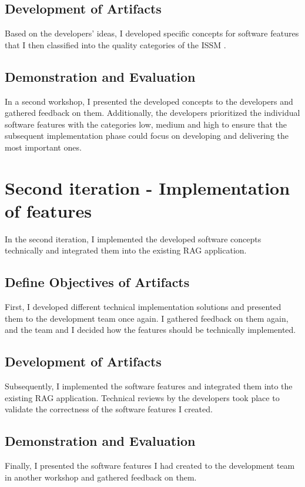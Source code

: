 \documentclass[
	english,
	ruledheaders=section,%
	class=report,%
	thesis={type=bachelor},%
	accentcolor=1b,%
	custommargins=true,%
	marginpar=false,%
	parskip=half-,%
	fontsize=11pt,%
	DIV=14,
]{tudapub}
\begin{document}
\subsection{Development of Artifacts}
Based on the developers' ideas, I developed specific concepts for software features that I then classified into the quality categories of the ISSM \parencite{DeloneMcLean2003ISSuccessTenYearUpdate}.
\subsection{Demonstration and Evaluation}
In a second workshop, I presented the developed concepts to the developers and gathered feedback on them. Additionally, the developers prioritized the individual software features with the categories low, medium and high to ensure that the subsequent implementation phase could focus on developing and delivering the most important ones.
\section{Second iteration - Implementation of features}
In the second iteration, I implemented the developed software concepts technically and integrated them into the existing RAG application.
\subsection{Define Objectives of Artifacts}
First, I developed different technical implementation solutions and presented them to the development team once again. I gathered feedback on them again, and the team and I decided how the features should be technically implemented.
\subsection{Development of Artifacts}
Subsequently, I implemented the software features and integrated them into the existing RAG application. Technical reviews by the developers took place to validate the correctness of the software features I created.
\subsection{Demonstration and Evaluation}
Finally, I presented the software features I had created to the development team in another workshop and gathered feedback on them.
\end{document}

